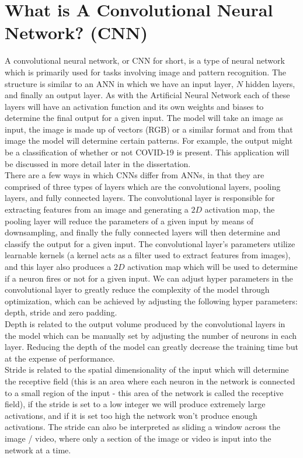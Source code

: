 \section{What is A Convolutional Neural Network? (CNN)}
A convolutional neural network, or CNN for short, is a type of neural network which is primarily used for tasks involving image and pattern recognition\cite{introToCnn}. The structure is similar to an ANN in which we have an input layer, $N$ hidden layers, and finally an output layer.  As with the Artificial Neural Network each of these layers will have an activation function and its own weights and biases to determine the final output for a given input. The model will take an image as input, the image is made up of vectors (RGB) or a similar format and from that image the model will determine certain patterns. For example, the output might be a classification of whether or not COVID-19 is present. This application will be discussed in more detail later in the dissertation. 
\\
There are a few ways in which CNNs differ from ANNs, in that they are comprised of three types of layers which are the convolutional layers, pooling layers, and fully connected layers\cite{introToCnn}.  The convolutional layer is responsible for extracting features from an image and generating a $2D$ activation map, the pooling layer will reduce the parameters of a given input by means of downsampling, and finally the fully connected layers will then determine and classify the output for a given input.  The convolutional layer's parameters utilize learnable kernels (a kernel acts as a filter used to extract features from images), and this layer also produces a $2D$ activation map which will be used to determine if a neuron fires or not for a given input.  We can adjust hyper parameters in the convolutional layer to greatly reduce the complexity of the model through optimization, which can be achieved by adjusting the following hyper parameters: depth, stride and zero padding.
\\
Depth is related to the output volume produced by the convolutional layers in the model which can be manually set by adjusting the number of neurons in each layer.  Reducing the depth of the model can greatly decrease the training time but at the expense of performance.
\\
Stride is related to the spatial dimensionality of the input which will determine the receptive field (this is an area where each neuron in the network is connected to a small region of the input - this area of the network is called the receptive field\cite{introToCnn}), if the stride is set to a low integer we will produce extremely large activations, and if it is set too high the network won't produce enough activations.  The stride can also be interpreted as sliding a window across the image / video, where only a section of the image or video is input into the network at a time.
